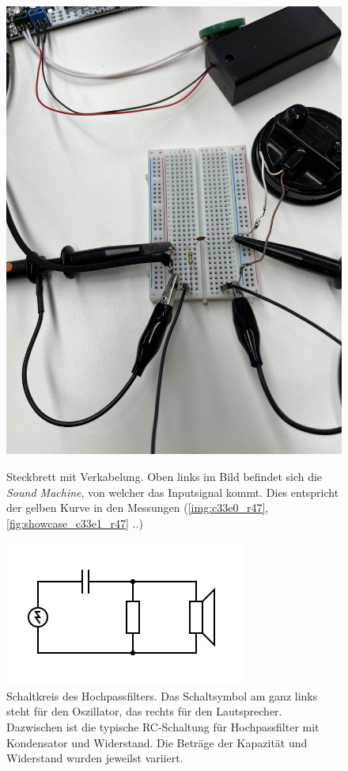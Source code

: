 \documentclass{article}
\begin{document}
\begin{figure}[htp]
        \centering
        \includegraphics[width=\linewidth]{figures/setup_close.png}
        \caption{Steckbrett mit Verkabelung. Oben links im Bild befindet sich die \emph{Sound Machine}, von welcher das Inputsignal kommt. Dies entspricht der gelben Kurve in den Messungen (\ref{img:c33e0_r47}, \ref{fig:showcase_c33e1_r47} ..)}
        \label{img:setup_close}
    \endminipage\hfill
        \centering
        \includegraphics[width=\linewidth]{figures/circuit.png}
        \caption{Schaltkreis des Hochpassfilters. Das Schaltsymbol am ganz links steht für den Oszillator, das rechts für den Lautsprecher. Dazwischen ist die typische RC-Schaltung für Hochpassfilter mit Kondensator und Widerstand. Die Beträge der Kapazität und Widerstand wurden jeweilst variiert.}
        \label{fig:circuit}
    \endminipage\hfill
\end{figure}
\end{document}
